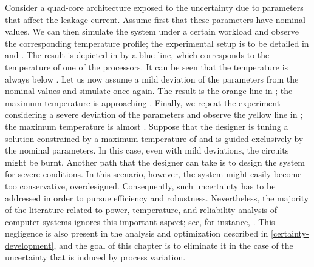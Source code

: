 Consider a quad-core architecture exposed to the uncertainty due to parameters
that affect the leakage current. Assume first that these parameters have nominal
values. We can then simulate the system under a certain workload and observe the
corresponding temperature profile; the experimental setup is to be detailed in
 and . The
result is depicted in  by a blue line, which corresponds to
the temperature of one of the processors. It can be seen that the temperature is
always below . Let us now assume a mild deviation of the parameters
from the nominal values and simulate once again. The result is the orange line
in ; the maximum temperature is approaching .
Finally, we repeat the experiment considering a severe deviation of the
parameters and observe the yellow line in ; the maximum
temperature is almost . Suppose that the designer is tuning a
solution constrained by a maximum temperature of  and is guided
exclusively by the nominal parameters. In this case, even with mild deviations,
the circuits might be burnt. Another path that the designer can take is to
design the system for severe conditions. In this scenario, however, the system
might easily become too conservative, overdesigned. Consequently, such
uncertainty has to be addressed in order to pursue efficiency and robustness.
Nevertheless, the majority of the literature related to power, temperature, and
reliability analysis of computer systems ignores this important aspect; see, for
instance, \cite{rao2009, rai2011, thiele2011}. This negligence is also present
in the analysis and optimization described in \cref{certainty-development}, and
the goal of this chapter is to eliminate it in the case of the uncertainty that
is induced by process variation.
